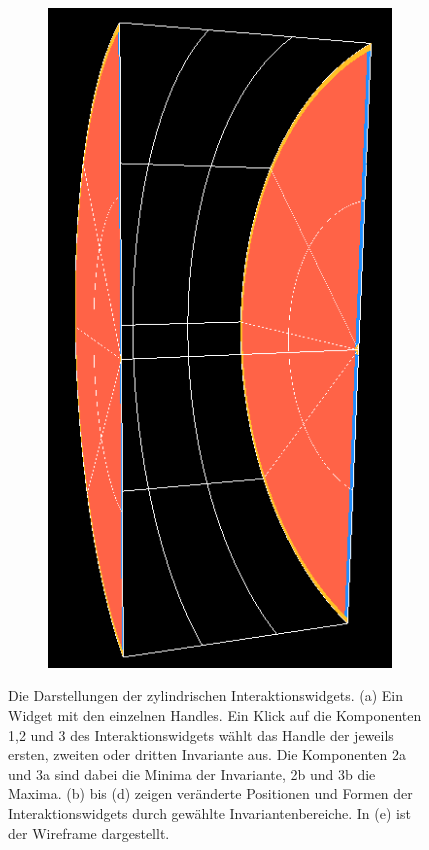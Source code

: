 \documentclass[a4paper,fontsize=12pt,toc=bib,halfparskip,ngerman]{scrartcl}
\begin{document}
\begin{figure}
\begin{subfigure}{0.15\textwidth}
		\includegraphics[width=\textwidth]{pictures/InteractionPlanes5.png}
		\subcaption{}
		\label{InteractionPlaneE}
	\end{subfigure}
	\hspace*{\fill}
	\caption{Die Darstellungen der zylindrischen Interaktionswidgets. (a) Ein Widget mit den einzelnen Handles. Ein Klick auf die Komponenten 1,2 und 3 des Interaktionswidgets w\"ahlt das Handle der jeweils ersten, zweiten oder dritten Invariante aus. Die Komponenten 2a und 3a sind dabei die Minima der Invariante, 2b und 3b die Maxima. (b) bis (d) zeigen ver\"anderte Positionen und Formen der Interaktionswidgets durch gew\"ahlte Invariantenbereiche. In (e) ist der Wireframe dargestellt.}
\end{figure}
\end{document}
